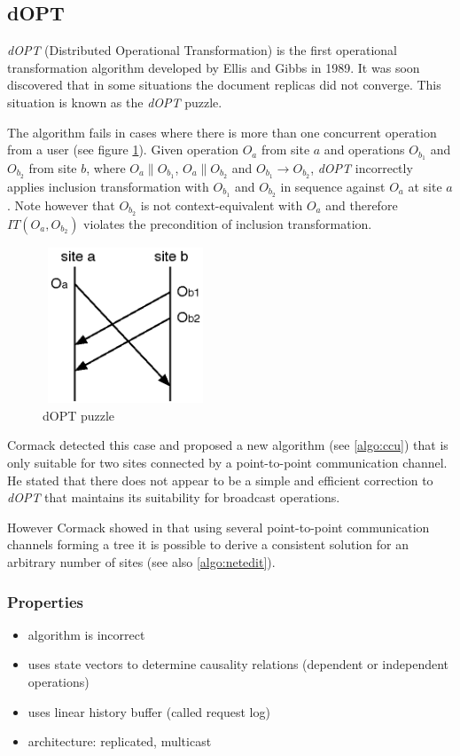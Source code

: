 \subsection{dOPT}
\label{algo:dopt}

\emph{dOPT} (Distributed Operational Transformation) is the first operational transformation algorithm developed by {Ellis and Gibbs}\cite{ellis} in 1989. It was soon discovered that in some situations the document replicas did not converge. This situation is known as the \emph{dOPT} puzzle.

The algorithm fails in cases where there is more than one concurrent operation from a user (see figure \ref{fig:doptpuzzle}). Given operation $O_{a}$ from site $a$ and operations $O_{b_{1}}$ and $O_{b_{2}}$ from site $b$, where $O_{a} \parallel O_{b_{1}}$, $O_{a} \parallel O_{b_{2}}$ and $O_{b_{1}} \rightarrow O_{b_{2}}$, \emph{dOPT} incorrectly applies inclusion transformation with  $O_{b_{1}}$ and $O_{b_{2}}$ in sequence against $O_{a}$ at site $a$. Note however that $O_{b_{2}}$ is not context-equivalent with $O_{a}$ and therefore $IT(O_{a},O_{b_{2}})$ violates the precondition of inclusion transformation.

\begin{figure}[H]
 \centering
 \includegraphics[width=1.94in,height=1.83in]{../../images/dopt_puzzle.eps}
 \caption{dOPT puzzle}
 \label{fig:doptpuzzle}
\end{figure}

Cormack\cite{cormack95a} detected this case and proposed a new algorithm (see \ref{algo:ccu}) that is only suitable for two sites connected by a point-to-point communication channel. He stated that there does not appear to be a simple and efficient correction to \emph{dOPT} that maintains its suitability for broadcast operations.

However Cormack showed in \cite{cormack95b} that using several point-to-point communication channels forming a tree it is possible to derive a consistent solution for an arbitrary number of sites (see also \ref{algo:netedit}).

\subsubsection{Properties}
\begin{itemize}
 \item algorithm is incorrect
 \item uses state vectors to determine causality relations (dependent or independent operations)
 \item uses linear history buffer (called request log)
 \item architecture: replicated, multicast
\end{itemize}

